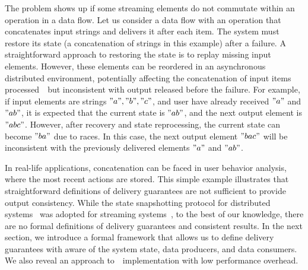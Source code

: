 The problem shows up if some streaming elements do not commutate within an operation in a data flow. 
Let us consider a data flow with an operation that concatenates input strings and delivers it after each item. 
The system must restore its state  (a concatenation of strings in this example) after a failure. 
A straightforward approach to restoring the state is to replay missing input elements. 
However, these elements can be reordered in an asynchronous distributed environment, potentially affecting the concatenation of input items processed~\eo\ but inconsistent with output released before the failure. 
For example, if input elements are strings $"a","b","c"$, and user have already received  $"a"$ and $"ab"$, it is expected that the current state is $"ab"$, and the next output element is $"abc"$. However, after recovery and state reprocessing, the current state can become $"ba"$ due to races. In this case, the next output element $"bac"$ will be inconsistent with the previously delivered elements $"a"$ and $"ab"$.  

In real-life applications, concatenation can be faced in user behavior analysis, where the most recent actions are stored. 
This simple example illustrates that straightforward definitions of delivery guarantees are not sufficient to provide output consistency. 
While the state snapshotting protocol for distributed systems~\cite{Chandy:1985:DSD:214451.214456} was adopted for streaming systems~\cite{2015arXiv150608603C}, to the best of our knowledge, there are no formal definitions of delivery guarantees and consistent results. 
In the next section, we introduce a formal framework that allows us to define delivery guarantees with aware of the system state, data producers, and data consumers. 
We also reveal an approach to~\eo\ implementation with low performance overhead. 


\
